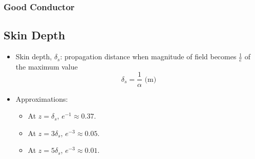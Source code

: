 \documentclass[a4paper]{article}
\begin{document}
\subsubsection{Good Conductor}
\begin{center}
\end{center}

\newpage
\subsection{Skin Depth}
\begin{itemize}
    \item Skin depth, $\delta_s$: propagation distance when magnitude of field becomes $\displaystyle\frac{1}{e}$ of the maximum value
    $$\delta_s = \frac{1}{\alpha}\text{ (m)}$$
    \item Approximations:
    \begin{itemize}[label=$\circ$]
        \item At $z=\delta_s$, $e^{-1} \approx 0.37$.
        \item At $z=3\delta_s$, $e^{-3} \approx 0.05$.
        \item At $z=5\delta_s$, $e^{-3} \approx 0.01$.
    \end{itemize}
\end{itemize}
\end{document}
